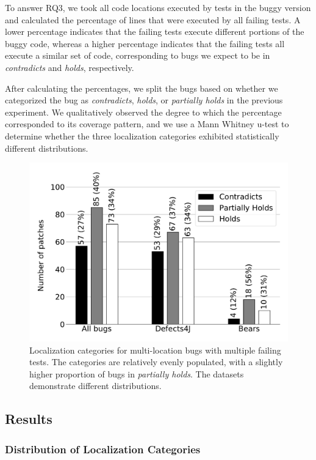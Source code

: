 \documentclass[10pt, conference]{IEEEtran}
\begin{document}
To answer RQ3, we took all code locations executed by tests in the buggy version and
calculated the percentage of lines that were executed by all failing tests. 
A lower percentage indicates that the failing tests execute different portions of the buggy 
code, whereas a higher percentage indicates that the failing tests all execute a similar
set of code, corresponding to bugs we expect to be in \emph{contradicts} and \emph{holds},
respectively.

After calculating the percentages, we split the bugs based on whether we categorized the bug 
as \emph{contradicts}, \emph{holds}, or \emph{partially holds} in the previous experiment.
We qualitatively observed the degree to which the percentage corresponded to its coverage 
pattern, and we use a Mann Whitney u-test to determine whether the three localization 
categories exhibited statistically different distributions.


\begin{figure}
	\includegraphics[width=\linewidth]{img/coverage_hist_all.pdf}
	\caption{\small Localization categories for multi-location bugs with multiple failing
      tests. The categories are relatively 
      evenly populated, with a slightly higher proportion of bugs in
      \emph{partially holds}. The datasets demonstrate different distributions.}
	\label{fig:coverage-all}
\end{figure}

\subsection{Results}

\subsubsection{Distribution of Localization Categories} \label{sec:cov_patterns}
\end{document}
